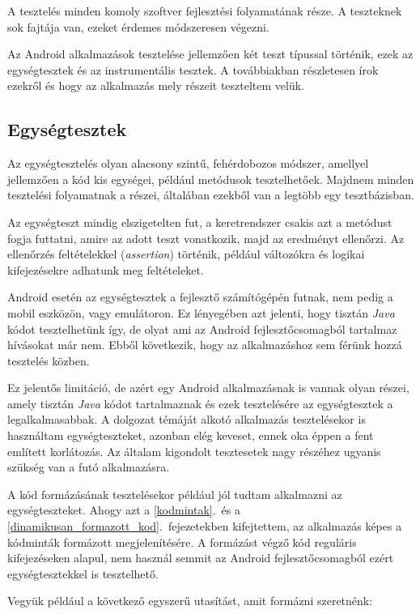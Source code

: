 \documentclass[12pt,a4paper]{article}
\begin{document}
	A tesztelés minden komoly szoftver fejlesztési folyamatának része. A teszteknek sok fajtája van, ezeket érdemes módszeresen végezni. 
	
	Az Android alkalmazások tesztelése jellemzően két teszt típussal történik, ezek az egységtesztek és az instrumentális tesztek. A továbbiakban részletesen írok ezekről és hogy az alkalmazás mely részeit teszteltem velük. 

	\subsection{Egységtesztek}
	
	Az egységtesztelés olyan alacsony szintű, fehérdobozos módszer, amellyel jellemzően a kód kis egységei, például metódusok tesztelhetőek. Majdnem minden tesztelési folyamatnak a részei, általában ezekből van a legtöbb egy tesztbázisban.  
	
	Az egységteszt mindig elszigetelten fut, a keretrendszer csakis azt a metódust fogja futtatni, amire az adott teszt vonatkozik, majd az eredményt ellenőrzi. Az ellenőrzés feltételekkel (\textit{assertion}) történik, például változókra és logikai kifejezésekre adhatunk meg feltételeket.
	
	Android esetén az egységtesztek a fejlesztő számítógépén futnak, nem pedig a mobil eszközön, vagy emulátoron. Ez lényegében azt jelenti, hogy tisztán \textit{Java} kódot tesztelhetünk így, de olyat ami az Android fejlesztőcsomagból tartalmaz hívásokat már nem. Ebből következik, hogy az alkalmazáshoz sem férünk hozzá tesztelés közben.
	
	Ez jelentős limitáció, de azért egy Android alkalmazásnak is vannak olyan részei, amely tisztán \textit{Java} kódot tartalmaznak és ezek tesztelésére az egységtesztek a legalkalmasabbak. A dolgozat témáját alkotó alkalmazás tesztelésekor is használtam egységteszteket, azonban elég keveset, ennek oka éppen a fent említett korlátozás. Az általam kigondolt tesztesetek nagy részéhez ugyanis szükség van a futó alkalmazásra.
	
	A kód formázásának tesztelésekor például jól tudtam alkalmazni az egységteszteket. Ahogy azt a \ref{kodmintak}.\ és a \ref{dinamikusan_formazott_kod}.\ fejezetekben kifejtettem, az alkalmazás képes a kódminták formázott megjelenítésére. A formázást végző kód reguláris kifejezéseken alapul, nem használ semmit az Android fejlesztőcsomagból ezért egységtesztekkel is tesztelhető.
	
	Vegyük például a következő egyszerű utasítást, amit formázni szeretnénk:
	
\end{document}
